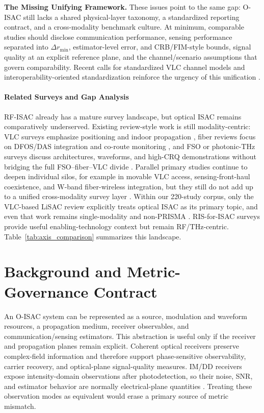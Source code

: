 \documentclass[letterpaper,journal]{IEEEtran}
\begin{document}
\textbf{The Missing Unifying Framework.} These issues point to the same gap: O-ISAC still lacks a shared physical-layer taxonomy, a standardized reporting contract, and a cross-modality benchmark culture. At minimum, comparable studies should disclose communication performance, sensing performance separated into $\Delta r_{\min}$, estimator-level error, and CRB/FIM-style bounds, signal quality at an explicit reference plane, and the channel/scenario assumptions that govern comparability. Recent calls for standardized VLC channel models and interoperability-oriented standardization reinforce the urgency of this unification .

\paragraph{Related Surveys and Gap Analysis}

RF-ISAC already has a mature survey landscape, but optical ISAC remains comparatively underserved. Existing review-style work is still modality-centric: VLC surveys emphasize positioning and indoor propagation , fiber reviews focus on DFOS/DAS integration and co-route monitoring , and FSO or photonic-THz surveys discuss architectures, waveforms, and high-CRQ demonstrations without bridging the full FSO--fiber--VLC divide . Parallel primary studies continue to deepen individual silos, for example in movable VLC access, sensing-front-haul coexistence, and W-band fiber-wireless integration, but they still do not add up to a unified cross-modality survey layer . Within our 220-study corpus, only the VLC-based LiSAC review explicitly treats optical ISAC as its primary topic, and even that work remains single-modality and non-PRISMA . RIS-for-ISAC surveys provide useful enabling-technology context but remain RF/THz-centric. Table~\ref{tab:axis_comparison} summarizes this landscape.

\section{Background and Metric-Governance Contract}
\label{sec:background_metric_contract}

An O-ISAC system can be represented as a source, modulation and waveform resources, a propagation medium, receiver observables, and communication/sensing estimators. This abstraction is useful only if the receiver and propagation planes remain explicit. Coherent optical receivers preserve complex-field information and therefore support phase-sensitive observability, carrier recovery, and optical-plane signal-quality measures. IM/DD receivers expose intensity-domain observations after photodetection, so their noise, SNR, and estimator behavior are normally electrical-plane quantities \cite{O_ISAC_001,O_ISAC_022,O_ISAC_028,O_ISAC_029,O_ISAC_039,O_ISAC_132}. Treating these observation modes as equivalent would erase a primary source of metric mismatch.
\end{document}
